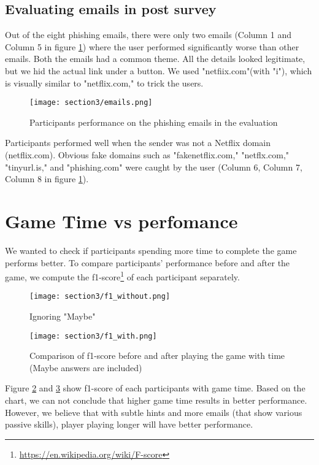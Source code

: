 \subsection{Evaluating emails in post survey}
Out of the eight phishing emails, there were only two emails (Column 1 and Column 5 in figure \ref{fig:emails}) where the user performed significantly worse than other emails. Both the emails had a common theme. All the details looked legitimate, but we hid the actual link under a button. We used "netfiix.com"(with "i"), which is visually similar to "netflix.com," to trick the users.

\begin{figure}[!ht]
    \begin{center}
        \texttt{[image: section3/emails.png]}
        \caption{Participants performance on the phishing emails in the evaluation}
        \label{fig:emails}
    \end{center}
\end{figure}

Participants performed well when the sender was not a Netflix domain (netflix.com). Obvious fake domains such as "fakenetflix.com," "netflx.com," "tinyurl.is," and "phishing.com" were caught by the user (Column 6, Column 7, Column 8 in figure \ref{fig:emails}).

\section{Game Time vs perfomance}
We wanted to check if participants spending more time to complete the game performs better. To compare participants' performance before and after the game, we compute the f1-score\footnote{\url{https://en.wikipedia.org/wiki/F-score}} of each participant separately.

\begin{figure}[!ht]
    \texttt{[image: section3/f1\_without.png]}
    \caption{Ignoring "Maybe"}
    \label{fig:f1_with_time_a}
\end{figure}

\begin{figure}[!ht]
    \texttt{[image: section3/f1\_with.png]}
    \caption{Comparison of f1-score before and after playing the game with time (Maybe answers are included)}
    \label{fig:f1_with_time_b}
\end{figure}


Figure \ref{fig:f1_with_time_a} and \ref{fig:f1_with_time_b} show f1-score of each participants with game time. Based on the chart, we can not conclude that higher game time results in better performance. However, we believe that with subtle hints and more emails (that show various passive skills), player playing longer will have better performance.

